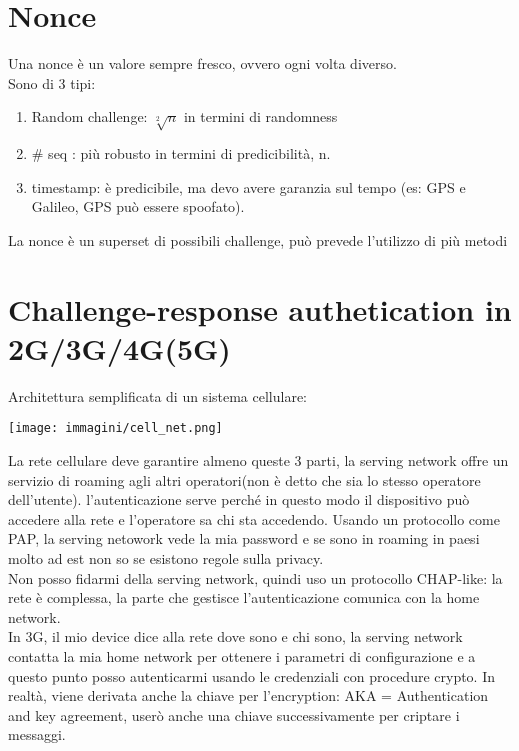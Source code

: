 \documentclass[16px]{article}
\begin{document}
\section{Nonce}
Una nonce è un valore sempre fresco, ovvero ogni volta diverso.\\ Sono di 3 tipi:
\begin{enumerate}
\item Random challenge: $\sqrt[2]{n}$ in termini di randomness
\item \# seq : più robusto in termini di predicibilità, n.
\item timestamp: è predicibile, ma devo avere garanzia sul tempo (es: GPS e Galileo, GPS può essere spoofato).
\end{enumerate}
La nonce è un superset di possibili challenge, può prevede l'utilizzo di più metodi
\section{Challenge-response authetication in 2G/3G/4G(5G)}
Architettura semplificata di un sistema cellulare:
\begin{center}
\texttt{[image: immagini/cell\_net.png]}
\end{center}
La rete cellulare deve garantire almeno queste 3 parti, la serving network offre un servizio di roaming agli altri operatori(non è detto che sia lo stesso operatore dell'utente). l'autenticazione serve perché in questo modo il dispositivo può accedere alla rete e l'operatore sa chi sta accedendo. Usando un protocollo come PAP, la serving netowork vede la mia password e se sono in roaming in paesi molto ad est non so se esistono regole sulla privacy.\\ Non posso fidarmi della serving network, quindi uso un protocollo CHAP-like: la rete è complessa, la parte che gestisce l'autenticazione comunica con la home network.\\ In 3G, il mio device dice alla rete dove sono e chi sono, la serving network contatta la mia home network per ottenere i parametri di configurazione e a questo punto posso autenticarmi usando le credenziali con procedure crypto. In realtà, viene derivata anche la chiave per l'encryption: AKA = Authentication and key agreement, userò anche una chiave successivamente per criptare i messaggi.
\end{document}
